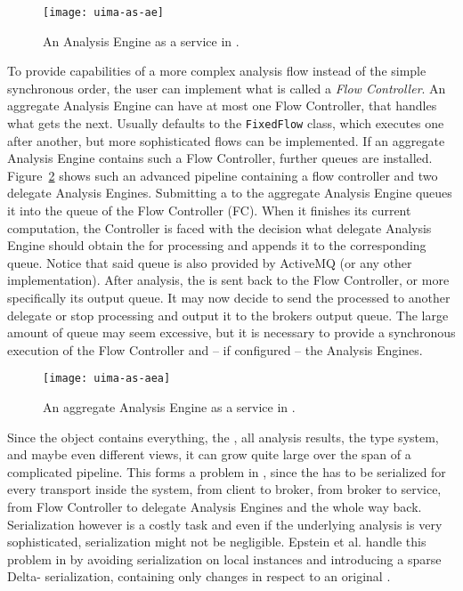 \begin{figure}[hbt]
	\centering
	\texttt{[image: uima-as-ae]}
	\caption[An Analysis Engine as a service in UIMA-AS.]{An Analysis Engine as a service in \uimaas{} \cite{uimaas:documentation}.}
	\label{fig:uimaas-ae}
\end{figure}

To provide capabilities of a more complex analysis flow instead of the simple synchronous order, the user can implement what is called a \emph{Flow Controller}. An aggregate Analysis Engine can have at most one Flow Controller, that handles what \anen{} gets the \cas{} next. Usually \uima{} defaults to the \lstinline|FixedFlow| class, which executes \anens{} one after another, but more sophisticated flows can be implemented. If an aggregate Analysis Engine contains such a Flow Controller, further queues are installed. Figure~\ref{fig:uimaas-aea} shows such an advanced pipeline containing a flow controller and two delegate Analysis Engines. Submitting a \cas{} to the aggregate Analysis Engine queues it into the queue of the Flow Controller (FC). When it finishes its current computation, the Controller is faced with the decision what delegate Analysis Engine should obtain the \cas{} for processing and appends it to the corresponding queue. Notice that said queue is also provided by ActiveMQ (or any other implementation). After analysis, the \cas{} is sent back to the Flow Controller, or more specifically its output queue. It may now decide to send the processed \cas{} to another delegate \anen{} or stop processing and output it to the brokers output queue. The large amount of queue may seem excessive, but it is necessary to provide a synchronous execution of the Flow Controller and -- if configured -- the Analysis Engines.

\begin{figure}[hbt]
	\centering
	\texttt{[image: uima-as-aea]}
	\caption[An aggregate Analysis Engine as a service in UIMA-AS.]{An aggregate Analysis Engine as a service in \uimaas{} \cite{uimaas:documentation}.}
	\label{fig:uimaas-aea}
\end{figure}

Since the \cas{} object contains everything, the \sofa{}, all analysis results, the type system, and maybe even different views, it can grow quite large over the span of a complicated pipeline. This forms a problem in \uimaas{}, since the \cas{} has to be serialized for every transport inside the system, from client to broker, from broker to service, from Flow Controller to delegate Analysis Engines and the whole way back. Serialization however is a costly task and even if the underlying \nlp{} analysis is very sophisticated, serialization might not be negligible. Epstein et al. handle this problem in \cite{epstein2012making} by avoiding serialization on local instances and introducing a sparse Delta-\cas{} serialization, containing only changes in respect to an original \cas{}.

